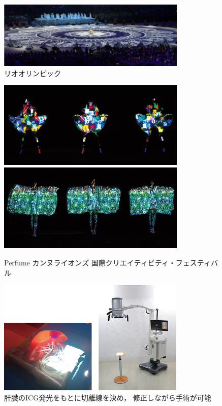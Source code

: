 \begin{figure}[b]
    \centering
    \includegraphics[width=9cm]{image/rio.png}
    \caption{リオオリンピック\cite{rioprojection}}
  \label{rio}
\end{figure}

\clearpage

\begin{figure}[t]
    \centering
    \includegraphics[width=9cm]{image/perfume1.png}
    \includegraphics[width=9cm]{image/perfume2.png}
    \caption{Perfume カンヌライオンズ 
    \protect\linebreak 国際クリエイティビティ・フェスティバル\cite{kirameku}}
  \label{perfume}
\end{figure}



\begin{figure}[b]
  \centering
  \includegraphics[width=9cm]{image/syujutsu.png}
  \caption{肝臓のICG発光をもとに切離線を決め，
  \protect\linebreak 修正しながら手術が可能\cite{iryou}}
\label{syujutsu}
\end{figure}

